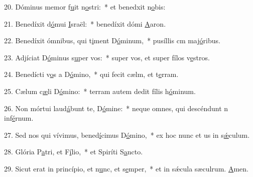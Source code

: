 20. Dóminus memor f\uline{u}it n\uline{o}stri:~* et benedxit n\uline{o}bis:\par 
21. Benedíxit d\uline{ó}mui \uline{I}sraël:~* benedíxit dómi \uline{A}aron.\par 
22. Benedíxit ómnibus, qui t\uline{i}ment D\uline{ó}minum,~* pusíllis cm maj\uline{ó}ribus.\par 
23. Adjíciat D\uline{ó}minus s\uline{u}per vos:~* super vos, et super fílos v\uline{e}stros.\par 
24. Benedícti v\uline{o}s a D\uline{ó}mino,~* qui fecit cælm, et t\uline{e}rram.\par 
25. Cælum c\uline{æ}li D\uline{ó}mino:~* terram autem dedit fílis h\uline{ó}minum.\par 
26. Non mórtui laud\uline{á}bunt te, D\uline{ó}mine:~* neque omnes, qui descéndunt n inf\uline{é}rnum.\par 
27. Sed nos qui vívimus, bened\uline{í}cimus D\uline{ó}mino,~* ex hoc nunc et us in s\uline{ǽ}culum.\par 
28. Glória P\uline{a}tri, et F\uline{í}lio,~* et Spiríti S\uline{a}ncto.\par 
29. Sicut erat in princípio, et n\uline{u}nc, et s\uline{e}mper,~* et in sǽcula sæculrum. \uline{A}men.\par 
